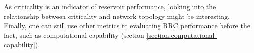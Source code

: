 As criticality is an indicator of reservoir performance,
looking into the relationship between criticality and network topology might be interesting.
Finally, one can still use other metrics to evaluating RRC performance before the fact,
such as computational capability (section \ref{section:computational-capability}).
